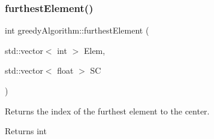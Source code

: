 \subsubsection{\texorpdfstring{furthest\+Element()}{furthestElement()}}
{\footnotesize\ttfamily int greedy\+Algorithm\+::furthest\+Element (\begin{DoxyParamCaption}\item[{std\+::vector$<$ int $>$}]{Elem,  }\item[{std\+::vector$<$ float $>$}]{SC }\end{DoxyParamCaption})}



Returns the index of the furthest element to the center. 

\begin{DoxyReturn}{Returns}
int 
\end{DoxyReturn}

